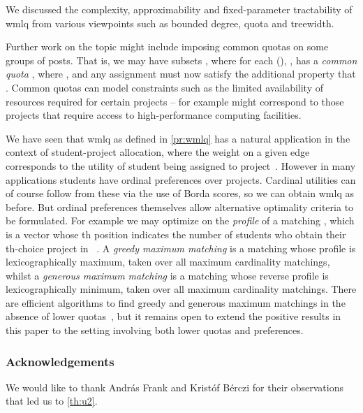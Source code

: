 \documentclass{llncs}
\begin{document}
We discussed the complexity, approximability and fixed-parameter tractability of {\sc wmlq} from various viewpoints such as bounded degree, quota and treewidth.

Further work on the topic might include imposing common quotas on some groups of posts. That is, we may have subsets , where for each  (), ,  has a \emph{common quota} , where , and any assignment  must now satisfy the additional property that . Common quotas can model constraints such as the limited availability of resources required for certain projects -- for example  might correspond to those projects that require access to high-performance computing facilities.

We have seen that {\sc wmlq} as defined in \cref{pr:wmlq} has a natural application in the context of student-project allocation, where the weight on a given edge  corresponds to the utility of student  being assigned to project~. However in many applications students have ordinal preferences over projects. Cardinal utilities can of course follow from these via the use of Borda scores, so we can obtain {\sc wmlq} as before.  But ordinal preferences themselves allow alternative optimality criteria to be formulated. For example we may optimize on the \emph{profile} of a matching , which is a vector whose th position indicates the number of students who obtain their th-choice project in ~\cite{Man13}. A \emph{greedy maximum matching} is a matching whose profile is lexicographically maximum, taken over all maximum cardinality matchings, whilst a \emph{generous maximum matching} is a matching whose reverse profile is lexicographically minimum, taken over all maximum cardinality matchings. There are efficient algorithms to find greedy and generous maximum matchings in the absence of lower quotas~\cite{KIMS15}, but it remains open to extend the positive results in this paper to the setting involving both lower quotas and preferences.

\subsubsection*{Acknowledgements}
We would like to thank Andr\'as Frank and Krist\'of B\'erczi for their observations that led us to \cref{th:u2}.

 
\end{document}
